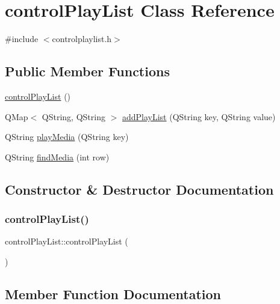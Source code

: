 \hypertarget{classcontrol_play_list}{}\section{control\+Play\+List Class Reference}
\label{classcontrol_play_list}


{\ttfamily \#include $<$controlplaylist.\+h$>$}

\subsection*{Public Member Functions}
\begin{DoxyCompactItemize}
\item 
\mbox{\hyperlink{classcontrol_play_list_a9a894367b2477ff12517e0cb0af45c46}{control\+Play\+List}} ()
\item 
Q\+Map$<$ Q\+String, Q\+String $>$ \mbox{\hyperlink{classcontrol_play_list_a2f4001958da45c1db0479f395a068f67}{add\+Play\+List}} (Q\+String key, Q\+String value)
\item 
Q\+String \mbox{\hyperlink{classcontrol_play_list_a33cea74544c49e152cee319b93701304}{play\+Media}} (Q\+String key)
\item 
Q\+String \mbox{\hyperlink{classcontrol_play_list_acd7333092f3c4b6e92064b359061685c}{find\+Media}} (int row)
\end{DoxyCompactItemize}


\subsection{Constructor \& Destructor Documentation}
\mbox{\label{classcontrol_play_list_a9a894367b2477ff12517e0cb0af45c46}} 
\subsubsection{\texorpdfstring{controlPlayList()}{controlPlayList()}}
{\footnotesize\ttfamily control\+Play\+List\+::control\+Play\+List (\begin{DoxyParamCaption}{ }\end{DoxyParamCaption})}



\subsection{Member Function Documentation}
\mbox{\label{classcontrol_play_list_a2f4001958da45c1db0479f395a068f67}} 
